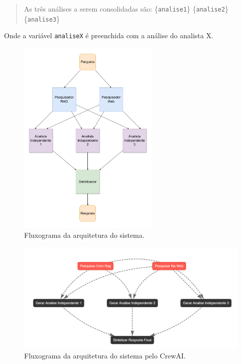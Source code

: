 \documentclass{article}
\begin{document}
\begin{itemize}
\begin{quote}
{        As três análises a serem consolidadas são:
        \{\texttt{analise1}\} \{\texttt{analise2}\} \{\texttt{analise3}\}}
    \end{quote}
    Onde a variável \texttt{analiseX} é preenchida com a análise do analista X.
\end{itemize}

\begin{figure}[htpb]
    \centering
    \includegraphics[width=0.6\textwidth]{resources/diagrama_custom_tp4.pdf}
    \caption{Fluxograma da arquitetura do sistema. }
    \label{fig:fluxo1}
\end{figure}

\begin{figure}[htpb]
    \centering
    \includegraphics[width=\textwidth]{resources/diagrama_crewai.png}
    \caption{Fluxograma da arquitetura do sistema pelo CrewAI. }
    \label{fig:fluxo2}
\end{figure}
\end{document}
